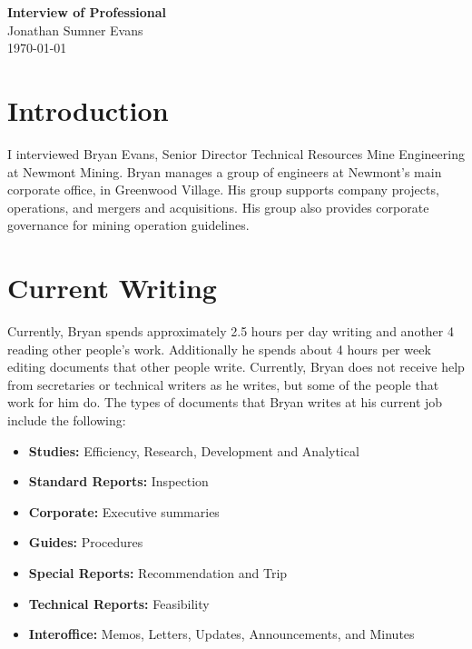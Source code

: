 \documentclass[11pt]{article}
\begin{document}
\begin{center}
    \textbf{Interview of Professional} \\
    Jonathan Sumner Evans \\
    \today
\end{center}

\section{Introduction}

I interviewed Bryan Evans, Senior Director Technical Resources Mine Engineering at Newmont Mining.
Bryan manages a group of engineers at Newmont's main corporate office, in Greenwood Village. His
group supports company projects, operations, and mergers and acquisitions. His group also provides
corporate governance for mining operation guidelines.

\section{Current Writing}

Currently, Bryan spends approximately 2.5 hours per day writing and another 4 reading other
people's work. Additionally he spends about 4 hours per week editing documents that other people
write. Currently, Bryan does not receive help from secretaries or technical writers as he writes,
but some of the people that work for him do. The types of documents that Bryan writes at his current
job include the following:

\begin{itemize}
    \item \textbf{Studies:} Efficiency, Research, Development and Analytical
    \item \textbf{Standard Reports:} Inspection
    \item \textbf{Corporate:} Executive summaries
    \item \textbf{Guides:} Procedures
    \item \textbf{Special Reports:} Recommendation and Trip
    \item \textbf{Technical Reports:} Feasibility
    \item \textbf{Interoffice:} Memos, Letters, Updates, Announcements, and Minutes
\end{itemize}
\end{document}
